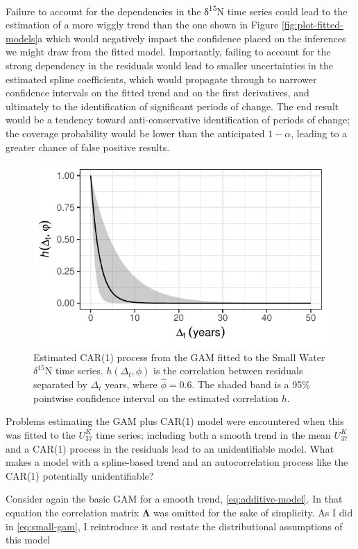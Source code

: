 \documentclass[12pt,]{article}
\newcommand{\uk}{\ensuremath{\mathit{U}^{\mathit{K}}_{\mathup{37}}}}
\begin{document}
Failure to account for the dependencies in the δ\textsuperscript{15}N
time series could lead to the estimation of a more wiggly trend than the
one shown in Figure \ref{fig:plot-fitted-models}a which would negatively
impact the confidence placed on the inferences we might draw from the
fitted model. Importantly, failing to account for the strong dependency
in the residuals would lead to smaller uncertainties in the estimated
spline coefficients, which would propagate through to narrower
confidence intervals on the fitted trend and on the first derivatives,
and ultimately to the identification of significant periods of change.
The end result would be a tendency toward anti-conservative
identification of periods of change; the coverage probability would be
lower than the anticipated \(1 - \alpha\), leading to a greater chance
of false positive results.

\begin{figure}

{\centering \includegraphics[width=0.5\linewidth]{manuscript_files/figure-latex/car1-plot-1} 

}

\caption{Estimated CAR(1) process from the GAM fitted to the Small Water $\delta^{15}\text{N}$ time series. $h(\Delta_t, \phi)$ is the correlation between residuals separated by $\Delta_t$ years, where $\hat{\phi} = \text{0.6}$. The shaded band is a 95\% pointwise confidence interval on the estimated correlation $h$.}\label{fig:car1-plot}
\end{figure}

Problems estimating the GAM plus CAR(1) model were encountered when this
was fitted to the \uk{} time series; including both a smooth trend in
the mean \uk{} and a CAR(1) process in the residuals lead to an
unidentifiable model. What makes a model with a spline-based trend and
an autocorrelation process like the CAR(1) potentially unidentifiable?

Consider again the basic GAM for a smooth trend,
\eqref{eq:additive-model}. In that equation the correlation matrix
\(\boldsymbol{\Lambda}\) was omitted for the sake of simplicity. As I
did in \eqref{eq:small-gam}, I reintroduce it and restate the
distributional assumptions of this model
\end{document}
